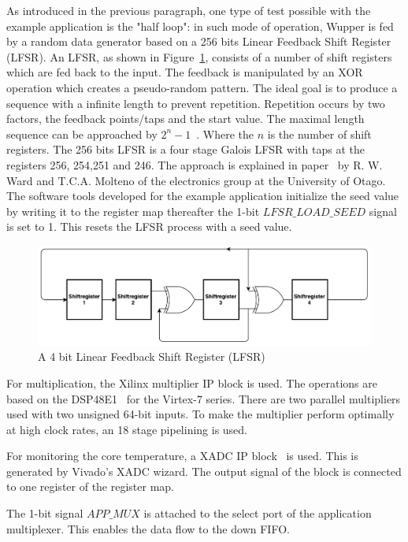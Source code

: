 \newpage
As introduced in the previous paragraph, one type of test possible with the example application is the "half loop": in such mode of operation, Wupper is fed by a random data generator based on a 256 bits Linear Feedback Shift Register (LFSR). An LFSR, as shown in Figure~\ref{fig:lfsr}, consists of a number of shift registers which are fed back to the input. The feedback is manipulated by an XOR operation which creates a pseudo-random pattern. The ideal goal is to produce a sequence with a infinite length to prevent repetition. Repetition occurs by two factors, the feedback points/taps and the start value. The maximal length sequence can be approached by $2^n-1$~\cite{lfsr}. Where the $n$ is the number of shift registers. The 256 bits LFSR is a four stage Galois LFSR with taps at the registers 256, 254,251 and 246. The approach is explained in paper~\cite{lfsrtable} by R. W. Ward and T.C.A. Molteno of the electronics group at the University of Otago.
The software tools developed for the example application initialize the seed value by writing it to the register map thereafter the 1-bit $LFSR\_LOAD\_SEED$ signal is set to 1. This resets the LFSR process with a seed value.

\begin{figure}[H]
	\centering
	\includegraphics[width = 0.8 \textwidth]{figures/lfsr.pdf}	
	\caption{A 4 bit Linear Feedback Shift Register (LFSR)}
	\label{fig:lfsr}
\end{figure}
For multiplication, the Xilinx multiplier IP block is used. The operations are based on the DSP48E1~\cite{DSP84E1} for the Virtex-7 series. There are two parallel multipliers used with two unsigned 64-bit inputs. To make the multiplier perform optimally at high clock rates, an 18 stage pipelining is used.

For monitoring the core temperature, a XADC IP block~\cite{xadc} is used. This is generated by Vivado's XADC wizard. The output signal of the block is connected to one register of the register map.

The 1-bit signal $APP\_MUX$ is attached to the select port of the application multiplexer. This enables the data flow to the down FIFO.

